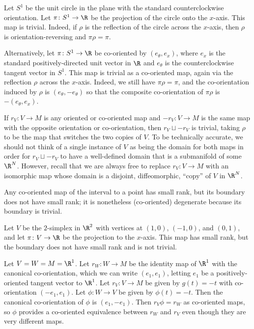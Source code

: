 \begin{example}
	Let $S^1$ be the unit circle in the plane with the standard counterclockwise orientation.
	Let $\pi \colon S^1 \to \R$ be the projection of the circle onto the $x$-axis.
	This map is trivial.
	Indeed, if $\rho$ is the reflection of the circle across the $x$-axis, then $\rho$ is orientation-reversing and $\pi \rho = \pi$.

	Alternatively, let $\pi \colon S^1 \to \R$ be co-oriented by $(e_\theta,e_x)$, where $e_x$ is the standard positively-directed unit vector in $\R$ and $e_\theta$ is the counterclockwise tangent vector in $S^1$.
	This map is trivial as a co-oriented map, again via the reflection $\rho$ across the $x$-axis.
	Indeed, we still have $\pi \rho = \pi$, and the co-orientation induced by $\rho$ is $(e_\theta,-e_\theta)$ so that the composite co-orientation of $\pi\rho$ is $-(e_\theta,e_x)$.
\end{example}

\begin{example}
	If $r_V \colon V \to M$ is any oriented or co-oriented map and $-r_V \colon V \to M$ is the same map with the opposite orientation or co-orientation, then $r_V \sqcup -r_V$ is trivial, taking $\rho$ to be the map that switches the two copies of $V$.
	To be technically accurate, we should not think of a single instance of $V$ as being the domain for both maps in order for $r_V \sqcup -r_V$ to have a well-defined domain that is a submanifold of some $\R^N$.
	However, recall that we are always free to replace $r_V \colon V \to M$ with an isomorphic map whose domain is a disjoint, diffeomorphic, ``copy'' of $V$ in $\R^N$.
\end{example}

\begin{example}
	Any co-oriented map of the interval to a point has small rank, but its boundary does not have small rank; it is nonetheless (co-oriented) degenerate because its boundary is trivial.
\end{example}

\begin{example}\label{E: projected triangle}
	Let $V$ be the $2$-simplex in $\R^2$ with vertices at $(1,0)$, $(-1,0)$, and $(0,1)$, and let $\pi \colon V \to \R$ be the projection to the $x$-axis.
	This map has small rank, but the boundary does not have small rank and is not trivial.
\end{example}

\begin{example}
	Let $V = W = M = \R^1$.
	Let $r_W \colon W \to M$ be the identity map of $\R^1$ with the canonical co-orientation, which we can write $(e_1,e_1)$, letting $e_1$ be a positively-oriented tangent vector to $\R^1$.
	Let $r_V \colon V \to M$ be given by $g(t) = -t$ with co-orientation $(-e_1,e_1)$.
	Let $\phi \colon W \to V$ be given by $\phi(t) = -t$.
	Then the canonical co-orientation of $\phi$ is $(e_1,-e_1)$.
	Then $r_V\phi = r_W$ as co-oriented maps, so $\phi$ provides a co-oriented equivalence between $r_W$ and $r_V$ even though they are very different maps.
\end{example}

